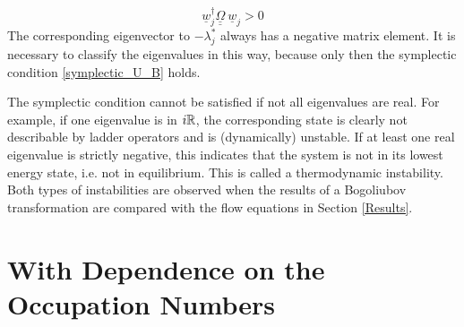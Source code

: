 \begin{equation}
\underline w_j^\dagger{\underline{\underline{\Omega}}}\ \underline w_j>0
\end{equation}
The corresponding eigenvector to $-\lambda_j^*$ always has a negative matrix element. It is necessary to classify the eigenvalues in this way, because only then the symplectic condition \ref{symplectic_U_B} holds.  \par
The symplectic condition cannot be satisfied if not all eigenvalues are real. For example, if one eigenvalue is in $i\mathbb{R}$, the corresponding state is clearly not describable by ladder operators and is (dynamically) unstable. If at least one real eigenvalue is strictly negative, this indicates that the system is not in its lowest energy state, i.e. not in equilibrium. This is called a thermodynamic instability. Both types of instabilities are observed when the results of a Bogoliubov transformation are compared with the flow equations in Section \ref{Results}.
\section{With Dependence on the Occupation Numbers}
